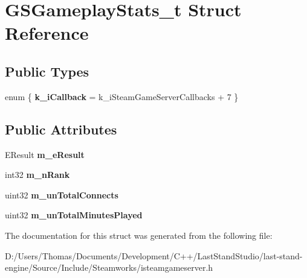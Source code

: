 \hypertarget{structGSGameplayStats__t}{}\section{G\+S\+Gameplay\+Stats\+\_\+t Struct Reference}
\label{structGSGameplayStats__t}
\subsection*{Public Types}
\begin{DoxyCompactItemize}
\item 
\hypertarget{structGSGameplayStats__t_a908550df6c038950ccb03c20c005e516}{}enum \{ {\bfseries k\+\_\+i\+Callback} = k\+\_\+i\+Steam\+Game\+Server\+Callbacks + 7
 \}\label{structGSGameplayStats__t_a908550df6c038950ccb03c20c005e516}

\end{DoxyCompactItemize}
\subsection*{Public Attributes}
\begin{DoxyCompactItemize}
\item 
\hypertarget{structGSGameplayStats__t_a4d749039980e994b290eefb8c2f90fd0}{}E\+Result {\bfseries m\+\_\+e\+Result}\label{structGSGameplayStats__t_a4d749039980e994b290eefb8c2f90fd0}

\item 
\hypertarget{structGSGameplayStats__t_a46cf95fd921bb78720d7ff05d4a29e04}{}int32 {\bfseries m\+\_\+n\+Rank}\label{structGSGameplayStats__t_a46cf95fd921bb78720d7ff05d4a29e04}

\item 
\hypertarget{structGSGameplayStats__t_a9ad119860eb259a4c6cfc83e2f5256ee}{}uint32 {\bfseries m\+\_\+un\+Total\+Connects}\label{structGSGameplayStats__t_a9ad119860eb259a4c6cfc83e2f5256ee}

\item 
\hypertarget{structGSGameplayStats__t_a070754c97a9d962ede6c1988a8de4309}{}uint32 {\bfseries m\+\_\+un\+Total\+Minutes\+Played}\label{structGSGameplayStats__t_a070754c97a9d962ede6c1988a8de4309}

\end{DoxyCompactItemize}


The documentation for this struct was generated from the following file\+:\begin{DoxyCompactItemize}
\item 
D\+:/\+Users/\+Thomas/\+Documents/\+Development/\+C++/\+Last\+Stand\+Studio/last-\/stand-\/engine/\+Source/\+Include/\+Steamworks/isteamgameserver.\+h\end{DoxyCompactItemize}
